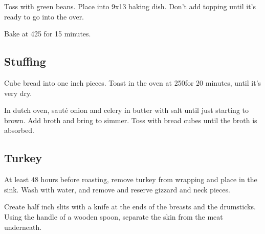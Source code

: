 \begin{recipe}
Toss with green beans. Place into 9x13 baking dish. Don't add topping until it's ready to go into the over.

Bake at 425 for 15 minutes.

\subsection{Stuffing}



Cube bread into one inch pieces. Toast in the oven at 250\degree for 20 minutes, until it's very dry.



In dutch oven, sauté onion and celery in butter with salt until just starting to brown. Add broth and bring to simmer. Toss with bread cubes until the broth is absorbed.

\subsection{Turkey}




At least 48 hours before roasting, remove turkey from wrapping and place in the sink. Wash with water, and remove and reserve gizzard and neck pieces.

Create half inch slits with a knife at the ends of the breasts and the drumsticks. Using the handle of a wooden spoon, separate the skin from the meat underneath.


\end{recipe}
